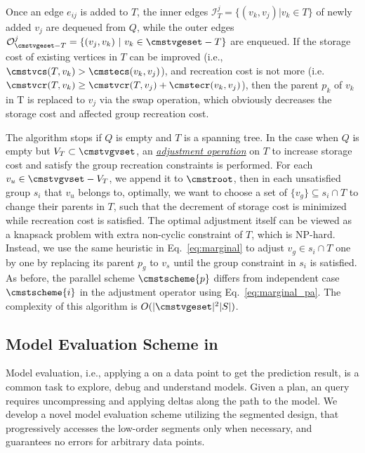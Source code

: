 \documentclass[conference]{IEEEtran}
\begin{document}
Once an edge $e_{ij}$ is added to $T$, the inner edges $\mathcal{I}^j_T = \{(v_k, v_j) | v_k \in T\}$ of newly added $v_j$ are dequeued from $Q$, while the outer edges $\mathcal{O}^j_{\cmstvgeset - T} = \{(v_j, v_k)\ |\ v_k \in \cmstvgeset - T\}$ are enqueued. If the storage cost of existing vertices in $T$ can be improved (i.e., $\cmstvcs(T, v_k) > \cmstecs(v_k, v_j)$), and recreation cost is not more (i.e. $\cmstvcr(T, v_k) \geq \cmstvcr(T, v_j) + \cmstecr(v_k,v_j)$), then the parent $p_k$ of $v_k$ in T is replaced to $v_j$ via the swap operation, which obviously decreases the storage cost and affected group recreation cost. 

The algorithm stops if $Q$ is empty and $T$ is a spanning tree. In the case when $Q$ is empty but $V_T \subset \cmstvgvset$, an \underline{\emph{adjustment operation}} on $T$ to increase storage cost and satisfy the group recreation constraints is performed. 
For each $v_u \in \cmstvgvset-V_T$, we append it to $\cmstroot$, then in each unsatisfied group $s_i$ that $v_u$ belongs to, optimally, we want to choose a set of $\{v_g\} \subseteq s_i \cap T$ to change their parents in $T$, such that the decrement of storage cost is minimized while recreation cost is satisfied. The optimal adjustment itself can be viewed as a knapsack problem with extra non-cyclic constraint of $T$, which is NP-hard. Instead, we use the same heuristic in Eq.~\ref{eq:marginal} to adjust $v_g \in s_i \cap T$ one by one by replacing its parent $p_g$ to $v_s$ until the group constraint in $s_i$ is satisfied.
 As before, the parallel scheme $\cmstscheme{p}$ differs from independent case $\cmstscheme{i}$ in the adjustment operator using Eq.~\ref{eq:marginal_pa}. The complexity of this algorithm is $O(|\cmstvgeset|^2|S|)$.


\subsection{Model Evaluation Scheme in {\weightstore}}
\label{subsec:pas_evaluation}
Model evaluation, i.e., applying a \dnn\forward on a data point to get the prediction result, is a common task to explore, debug and understand models. 
Given a \weightstore\storage plan, an  query requires uncompressing and applying deltas along the path to the model. We develop 
a novel model evaluation scheme utilizing the segmented design, that progressively accesses the low-order segments only when necessary, and 
guarantees no errors for arbitrary data points. 
\end{document}

